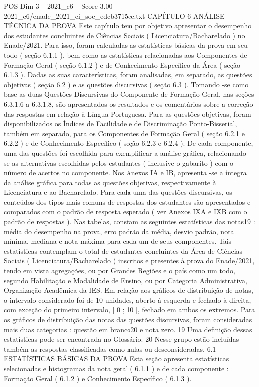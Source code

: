 \begin{textsample}{POS Dim 3 – 2021\_c6 – Score 3.00 – 2021\_c6/enade\_2021\_ci\_soc\_edcb3715cc.txt}  \label{ex:f3_pos_048}
CAPÍTULO 6 ANÁLISE TÉCNICA DA PROVA Este capítulo tem por objetivo apresentar o desempenho dos estudantes concluintes de Ciências Sociais ( Licenciatura/Bacharelado ) no Enade/2021.
Para isso, foram calculadas as estatísticas básicas da prova em seu todo ( seção 6.1.1 ), bem como as estatísticas relacionadas aos Componentes de Formação Geral ( seção 6.1.2 ) e de Conhecimento Específico da Área ( seção 6.1.3 ).
Dadas as suas características, foram analisadas, em separado, as questões objetivas ( seção 6.2 ) e as questões discursivas ( seção 6.3 ).
Tomando -se como base as duas Questões Discursivas do Componente de Formação Geral, nas seções 6.3.1.6 a 6.3.1.8, são apresentados os resultados e os comentários sobre a correção das respostas em relação à Língua Portuguesa.
Para as questões objetivas, foram disponibilizados os Índices de Facilidade e de Discriminação Ponto-Bisserial, também em separado, para os Componentes de Formação Geral ( seção 6.2.1 e 6.2.2 ) e de Conhecimento Específico ( seção 6.2.3 e 6.2.4 ).
De cada componente, uma das questões foi escolhida para exemplificar a análise gráfica, relacionando -se as alternativas escolhidas pelos estudantes ( inclusive o gabarito ) com o número de acertos no componente.
Nos Anexos IA e IB, apresenta -se a íntegra da análise gráfica para todas as questões objetivas, respectivamente à Licenciatura e ao Bacharelado.
Para cada uma das questões discursivas, os conteúdos dos tipos mais comuns de respostas dos estudantes são apresentados e comparados com o padrão de resposta esperado ( ver Anexos IXA e IXB com o padrão de respostas ).
Nas tabelas, constam as seguintes estatísticas das notas19 : média do desempenho na prova, erro padrão da média, desvio padrão, nota mínima, mediana e nota máxima para cada um de seus componentes.
Tais estatísticas contemplam o total de estudantes concluintes da Área de Ciências Sociais ( Licenciatura/Bacharelado ) inscritos e presentes à prova do Enade/2021, tendo em vista agregações, ou por Grandes Regiões e o país como um todo, segundo Habilitação e Modalidade de Ensino, ou por Categoria Administrativa, Organização Acadêmica da IES.
Em relação aos gráficos de distribuição de notas, o intervalo considerado foi de 10 unidades, aberto à esquerda e fechado à direita, com exceção do primeiro intervalo, [ 0 ; 10 ], fechado em ambos os extremos.
Para os gráficos de distribuição das notas das questões discursivas, foram consideradas mais duas categorias : questão em branco20 e nota zero. 19 Uma definição dessas estatísticas pode ser encontrada no Glossário. 20 Nesse grupo estão incluídas também as respostas classificadas como nulas ou desconsideradas. 6.1 ESTATÍSTICAS BÁSICAS DA PROVA Esta seção apresenta estatísticas selecionadas e histogramas da nota geral ( 6.1.1 ) e de cada componente : Formação Geral ( 6.1.2 ) e Conhecimento Específico ( 6.1.3 ).

\end{textsample}
